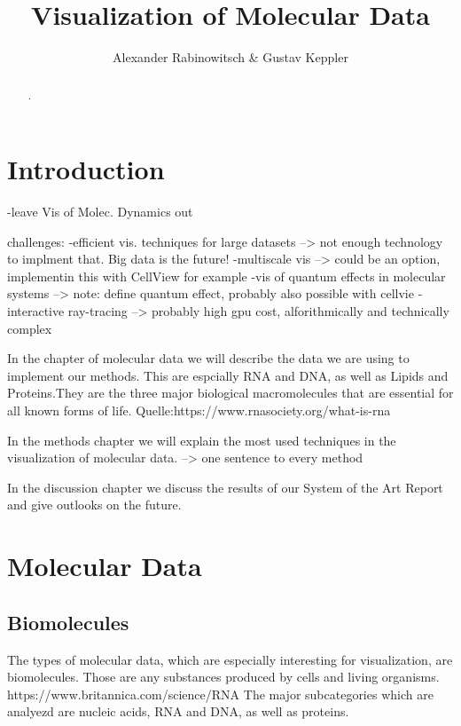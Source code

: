 \documentclass{egpubl}
\title      {Visualization of Molecular Data}
\author{Alexander Rabinowitsch \& Gustav Keppler}
\begin{document}

\maketitle

\begin{abstract}
 .

\end{abstract}


\section{Introduction}
-leave Vis of Molec. Dynamics out

challenges:
-efficient vis. techniques for large datasets
--> not enough technology to implment that.
    Big data is the future!
-multiscale vis
    --> could be an option, implementin this with CellView for example
-vis of quantum effects in molecular systems
    --> note: define quantum effect, probably also possible with cellvie
-interactive ray-tracing
   --> probably high gpu cost, alforithmically and technically complex


In the chapter of molecular data we will describe the data we are using to implement our methods. This are espcially RNA and DNA, as well as Lipids and Proteins.They are the three major biological macromolecules that are essential for all known forms of life. Quelle:https://www.rnasociety.org/what-is-rna

In the methods chapter we will explain the most used techniques in the visualization of molecular data.
--> one sentence to every method

In the discussion chapter we discuss the results of our System of the Art Report and give outlooks on the future.

\section{Molecular Data} %
\subsection{Biomolecules}
The types of molecular data, which are especially interesting for visualization, are biomolecules. Those are any substances produced by cells and living organisms. https://www.britannica.com/science/RNA
The major subcategories which are analyezd are nucleic acids, RNA and DNA, as well as proteins.
\end{document}
